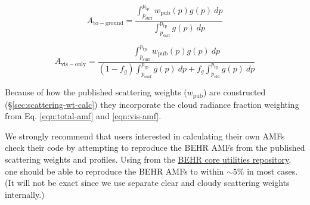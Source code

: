 \documentclass[12pt]{article}
\begin{document}
	\begin{equation}\label{eqn:custom-tot-amf}
	A_{\mathrm{to-ground}} = \frac{\int_{p_{\mathrm{surf}}}^{p_{\mathrm{tp}}} w_{\mathrm{pub}}(p) g(p) \: dp}{\int_{p_{\mathrm{surf}}}^{\mathrm{p_{tp}}} g(p) \: dp}
	\end{equation}
	
	\begin{equation}\label{eqn:custom-vis-amf}
	A_{\mathrm{vis-only}} = \frac{\int_{p_{\mathrm{surf}}}^{p_{\mathrm{tp}}} w_{\mathrm{pub}}(p) g(p) \: dp}{(1-f_g)\int_{p_{\mathrm{surf}}}^{p_\mathrm{{tp}}} g(p) \: dp + f_g \int_{p_{\mathrm{cld}}}^{p_{\mathrm{tp}}} g(p) \: dp}
	\end{equation}
	
	Because of how the published scattering weights ($w_{\mathrm{pub}}$) are constructed (\S\ref{sec:scattering-wt-calc}) they incorporate the cloud radiance fraction weighting from Eq. \eqref{eqn:total-amf} and \eqref{eqn:vis-amf}.
	
	We strongly recommend that users interested in calculating their own AMFs check their code by attempting to reproduce the BEHR AMFs from the published scattering weights and  profiles. Using  from the \href{https://github.com/CohenBerkeleyLab/BEHR-core-utils}{BEHR core utilities repository}, one should be able to reproduce the BEHR AMFs to within $\sim 5\%$ in most cases. (It will not be exact since we use separate clear and cloudy scattering weights internally.)
	
\end{document}
